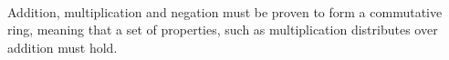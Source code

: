 \begin{AgdaMultiCode}
\begin{code}[hide]
%
\>[4]\AgdaSpace{}%
%
\>[28]\AgdaSymbol{\{}\AgdaSpace{}%
\AgdaSymbol{=}\AgdaSpace{}%
\AgdaSymbol{\}}\AgdaSpace{}%
\<%
\\
%
\>[4]\AgdaSpace{}%
\AgdaSpace{}%
\AgdaSymbol{\{}\AgdaSpace{}%
\AgdaSymbol{=}\AgdaSpace{}%
\AgdaSymbol{\}}\AgdaSpace{}%
\<%
\\
\>[0]\<%
\\
%
\>[4]\<%
\end{code}
Addition, multiplication and negation must be proven to form a commutative ring,
meaning that a set of properties, such as multiplication distributes over addition
must hold. \cite{CommRingTheory}
\begin{code}%
\>[4][@{}l@{\AgdaIndent{1}}]%
\>[6]\AgdaSpace{}%
\AgdaSymbol{:}\AgdaSpace{}%
\AgdaSpace{}%
\AgdaOperator{\AgdaField{\AgdaUnderscore{}+\AgdaUnderscore{}}}\AgdaSpace{}%
\AgdaOperator{\AgdaField{\AgdaUnderscore{}*\AgdaUnderscore{}}}\AgdaSpace{}%
\AgdaOperator{\AgdaField{-\AgdaUnderscore{}}}\AgdaSpace{}%
\AgdaSpace{}%
\<%
\end{code}

\end{AgdaMultiCode}
